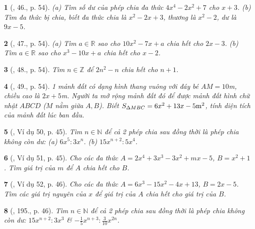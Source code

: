 \documentclass{article}
\newtheorem{baitoan}{}
\begin{document}
\begin{baitoan}[\cite{SBT_Toan_7_Canh_Dieu_tap_2}, 46., p. 54]
	(a) Tìm số dư của phép chia đa thức $4x^4 - 2x^2 + 7$ cho $x + 3$. (b) Tìm đa thức bị chia, biết đa thức chia là $x^2 - 2x + 3$, thương là $x^2 - 2$, dư là $9x - 5$.
\end{baitoan}

\begin{baitoan}[\cite{SBT_Toan_7_Canh_Dieu_tap_2}, 47., p. 54]
	(a) Tìm $a\in\mathbb{R}$ sao cho $10x^2 - 7x + a$ chia hết cho $2x - 3$. (b) Tìm $a\in\mathbb{R}$ sao cho $x^3 - 10x + a$ chia hết cho $x - 2$.
\end{baitoan}

\begin{baitoan}[\cite{SBT_Toan_7_Canh_Dieu_tap_2}, 48., p. 54]
	Tìm $n\in\mathbb{Z}$ để $2n^2 - n$ chia hết cho $n + 1$.
\end{baitoan}

\begin{baitoan}[\cite{SBT_Toan_7_Canh_Dieu_tap_2}, 49., p. 54]
	1 mảnh đất có dạng hình thang vuông với đáy bé $AM = 10$\emph{m}, chiều cao là $2x + 5$\emph{m}. Người ta mở rộng mảnh đất đó để được mảnh đất hình chữ nhật $ABCD$ ($M$ nằm giữa $A,B$). Biết $S_{\Delta MBC} = 6x^2 + 13x - 5{\rm m}^2$, tính diện tích của mảnh đất lúc ban đầu.
\end{baitoan}

\begin{baitoan}[\cite{Tuyen_Toan_7}, Ví dụ 50, p. 45]
	Tìm $n\in\mathbb{N}$ để cả 2 phép chia sau đồng thời là phép chia không còn dư: (a) $6x^5:3x^n$. (b) $15x^{n+2}:5x^4$.
\end{baitoan}

\begin{baitoan}[\cite{Tuyen_Toan_7}, Ví dụ 51, p. 45]
	Cho các đa thức $A = 2x^4 + 3x^3 - 3x^2 + mx - 5$, $B = x^2 + 1$. Tìm giá trị của $m$ để $A$ chia hết cho $B$.
\end{baitoan}

\begin{baitoan}[\cite{Tuyen_Toan_7}, Ví dụ 52, p. 46]
	Cho các đa thức $A = 6x^3 - 15x^2 - 4x + 13$, $B = 2x - 5$. Tìm các giá trị nguyên của $x$ để giá trị của $A$ chia hết cho giá trị của $B$.
\end{baitoan}

\begin{baitoan}[\cite{Tuyen_Toan_7}, 195., p. 46]
	Tìm $n\in\mathbb{N}$ để cả 2 phép chia sau đồng thời là phép chia không còn dư: $15x^{n+2}:3x^3$ \& $-\frac{1}{5}x^{n+3}:\frac{3}{10}x^{2n}$.
\end{baitoan}
\end{document}
